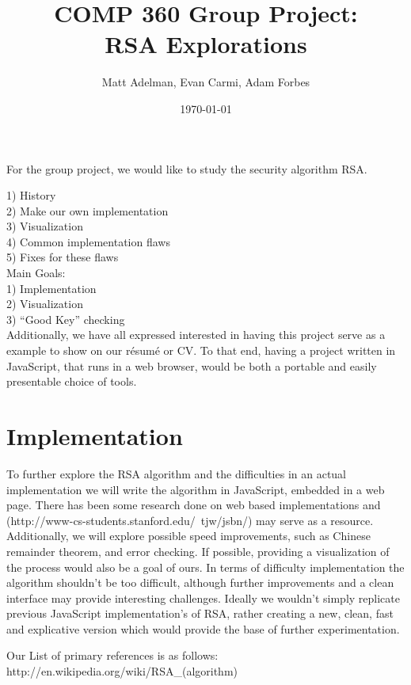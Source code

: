 \documentclass[12pt]{article}
\title{COMP 360 Group Project:\\RSA Explorations}
\author{Matt Adelman, Evan Carmi, Adam Forbes}
\date{\today}
\begin{document}
\maketitle

For the group project, we would like to study the security algorithm RSA. 

1) History\\
2) Make our own implementation\\
3) Visualization\\
4) Common implementation flaws\\
5) Fixes for these flaws\\

Main Goals:\\
1) Implementation\\
2) Visualization\\
3) ``Good Key'' checking\\


Additionally, we have all expressed interested in having this project serve as 
a example to show on our résumé or CV. To that end, having a project written in
JavaScript, that runs in a web browser, would be both a portable and easily 
presentable choice of tools.

\bigbreak

\section{Implementation}
To further explore the RSA algorithm and the difficulties in an actual 
implementation we will write the algorithm in JavaScript, embedded in a web 
page. There has been some research done on web based implementations and 
(http://www-cs-students.stanford.edu/~tjw/jsbn/) may serve as a resource. 
Additionally, we will explore possible speed improvements, such as Chinese 
remainder theorem, and error checking. If possible, providing a visualization
of the process would also be a goal of ours. In terms of difficulty
implementation the algorithm shouldn't be too difficult, although further 
improvements and a clean interface may provide interesting challenges. Ideally 
we wouldn't simply replicate previous JavaScript implementation's of RSA, 
rather creating a new, clean, fast and explicative version which would provide 
the base of further experimentation.




Our List of primary references is as follows:
http://en.wikipedia.org/wiki/RSA\_(algorithm)
\end{document}
